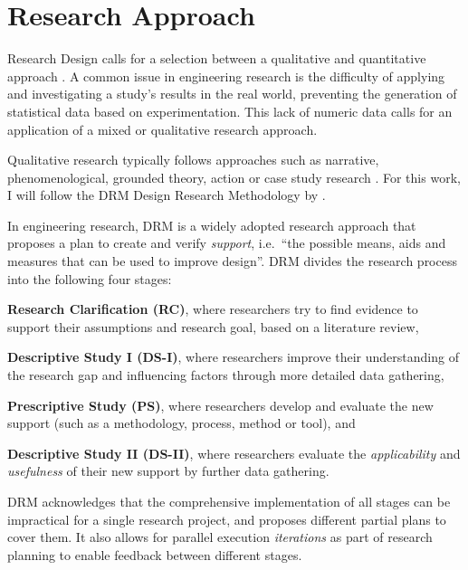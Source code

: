 \documentclass[a4paper,nobib,justified,final]{tufte-book}
\begin{document}
\chapter{Research Approach}
\label{chap:RESEARCH_APPROACH}

Research Design calls for a selection between a qualitative and quantitative approach \autocite{creswellResearchDesignQualitative2023}. A common issue in engineering research is the difficulty of applying and investigating a study's results in the real world, preventing the generation of statistical data based on experimentation. This lack of numeric data calls for an application of a mixed or qualitative research approach.

Qualitative research typically follows approaches such as narrative, phenomenological, grounded theory, action or case study research \autocite{creswellQualitativeInquiryResearch2025}. 
For this work, I will follow
the DRM Design Research Methodology \autocite{blessingDRMDesignResearch2009} by \citeauthor{blessingDRMDesignResearch2009}.

In engineering research, DRM is a widely adopted research approach that proposes a plan to create and verify \emph{support}, i.e.~``the possible means, aids and measures that can be used to improve design''. DRM divides the research process into the following four stages:
\begin{enumerate*}
	\item \textbf{Research Clarification (RC)}, where researchers try to find evidence to support their assumptions and research goal, based on a literature review,
	\item \textbf{Descriptive Study I (DS-I)}, where researchers improve their understanding of the research gap and influencing factors through more detailed data gathering,
	\item \textbf{Prescriptive Study (PS)}, where researchers develop and evaluate the new support (such as a methodology, process, method or tool), and
	\item \textbf{Descriptive Study II (DS-II)}, where researchers evaluate the \emph{applicability} and \emph{usefulness} of their new support by further data gathering.
\end{enumerate*}

DRM acknowledges that the comprehensive implementation of all stages can be impractical for a single research project, and proposes different partial plans to cover them. It also allows for parallel execution \emph{iterations} as part of research planning to enable feedback between different stages.
\end{document}
